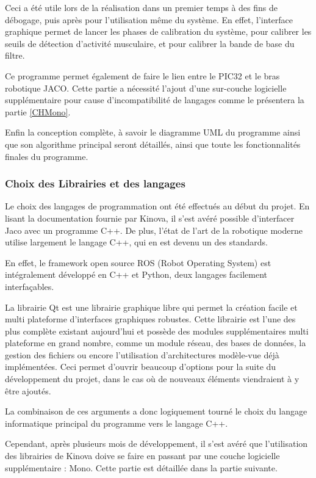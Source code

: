 \documentclass[letterpaper, twoside, 12pt, memoire, creativecommons, hyperref]{thETS}
\begin{document}
Ceci a été utile lors de la réalisation dans un premier temps à des fins de débogage, puis après pour l'utilisation même du système. En effet, l'interface graphique permet de lancer les phases de calibration du système, pour calibrer les seuils de détection d'activité musculaire, et pour calibrer la bande de base du filtre. 

Ce programme permet également de faire le lien entre le PIC32 et le bras robotique JACO. Cette partie a nécessité l'ajout d'une sur-couche logicielle supplémentaire pour cause d'incompatibilité de langages comme le présentera la partie \ref{CHMono}.

Enfin la conception complète, à savoir le diagramme UML du programme ainsi que son algorithme principal seront détaillés, ainsi que toute les fonctionnalités finales du programme.

\subsubsection{Choix des Librairies et des langages}

Le choix des langages de programmation ont été effectués au début du projet. En lisant la documentation fournie par Kinova, il s'est avéré possible d'interfacer Jaco avec un programme C++. De plus, l'état de l'art de la robotique moderne utilise largement le langage C++, qui en est devenu un des standards. 

En effet, le framework open source ROS (Robot Operating System) est intégralement développé en C++ et Python, deux langages facilement interfaçables. 

La librairie Qt est une librairie graphique libre qui permet la création facile et multi plateforme d'interfaces graphiques robustes. Cette librairie est l'une des plus complète existant aujourd'hui et possède des modules supplémentaires multi plateforme en grand nombre, comme un module réseau, des bases de données, la gestion des fichiers ou encore l'utilisation d'architectures modèle-vue déjà implémentées. Ceci permet d'ouvrir beaucoup d'options pour la suite du développement du projet, dans le cas où de nouveaux éléments viendraient à y être ajoutés. 

La combinaison de ces arguments a donc logiquement tourné le choix du langage informatique principal du programme vers le langage C++.

Cependant, après plusieurs mois de développement, il s'est avéré que l'utilisation des librairies de Kinova doive se faire en passant par une couche logicielle supplémentaire : Mono. Cette partie est détaillée dans la partie suivante.
\end{document}

